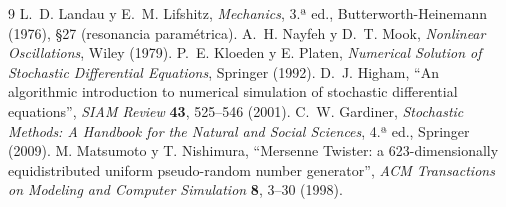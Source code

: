 \documentclass[12pt,a4paper]{article}
\begin{document}
\begin{thebibliography}{9}
 L.~D. Landau y E.~M. Lifshitz, \textit{Mechanics}, 3.ª ed., Butterworth-Heinemann (1976), §27 (resonancia paramétrica).
 A.~H. Nayfeh y D.~T. Mook, \textit{Nonlinear Oscillations}, Wiley (1979).
 P.~E. Kloeden y E. Platen, \textit{Numerical Solution of Stochastic Differential Equations}, Springer (1992).
 D.~J. Higham, ``An algorithmic introduction to numerical simulation of stochastic differential equations'', \textit{SIAM Review} \textbf{43}, 525--546 (2001).
 C.~W. Gardiner, \textit{Stochastic Methods: A Handbook for the Natural and Social Sciences}, 4.ª ed., Springer (2009).
 M. Matsumoto y T. Nishimura, ``Mersenne Twister: a 623-dimensionally equidistributed uniform pseudo-random number generator'', \textit{ACM Transactions on Modeling and Computer Simulation} \textbf{8}, 3--30 (1998).
\end{thebibliography}
\end{document}
